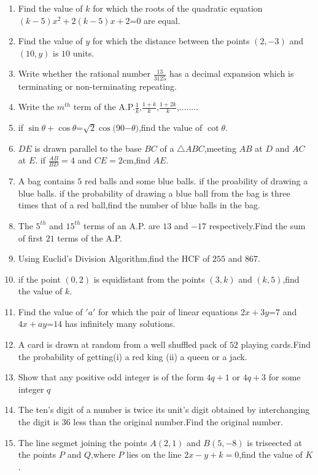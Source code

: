 \documentclass{article}
\begin{document}
\begin{enumerate}

	\item Find the value of $k$ for which the roots of  the quadratic equation $(k-5)x^2+2(k-5)x+2$=$0$ are equal.
	\item Find the value of $y$ for which the  distance between the points $(2,-3)$ and $(10,y)$ is $10$ units.
\item Write whether the rational number $\frac{13}{3125}$ has a decimal expansion which is  terminating or non-terminating repeating.
\item Write the $m^{th}$ term of the A.P.$\frac{1}{k}$,$\frac{1+k}{k}$,$\frac{1+2k}{k}$,........
\item if $\sin\theta+\cos\theta$=$\sqrt{2}\cos($90\degree{}$-\theta)$,find the value of $\cot\theta$.
\item $DE$ is drawn parallel to the base $BC$ of a $\triangle ABC$,meeting $AB$ at $D$ and $AC$ at $E$. if $\frac{AB}{BD}=4$ and $CE=2$cm,find $AE$.
\item A bag contains $5$ red balls and some blue balls. if the proability of drawing a blue balls. if the probability of drawing a blue ball from the bag is three times that of a red ball,find the number of blue balls in the bag.
\item The $5^ {th}$ and $15^ {th}$ terms of an A.P. are $13$ and $-17$ respectively.Find the sum of first $21$ terms of the A.P.
\item Using Euclid's Division Algorithm,find the HCF of $255$ and $867$.
\item if the point $(0,2)$ is equidistant from the points $(3,k)$ and $(k,5)$,find the value of $k$.
\item Find the value of  $'a'$ for which the pair of linear equations $2x+3y$=$7$ and $4x+ay$=$14$ has infinitely many solutions.
\item A card  is drawn at random from a well shuffled pack of $52$ playing  cards.Find the probability of getting(i) a red king (ii) a queen or a jack.
\item Show that any  positive odd integer is of the form $4q+1$ or $4q+3$ for some integer $q$
\item The ten's digit of a number is twice its unit's digit obtained by interchanging the digit is $36$ less than the original number.Find the original number.
\item The line segmet joining the points $A(2,1)$ and $B(5,-8)$ is triseected at the points $P$ and $Q$,where $P$ lies on the line $2x-y+k=0$,find the value of $K$.

\end{enumerate}
\end{document}
